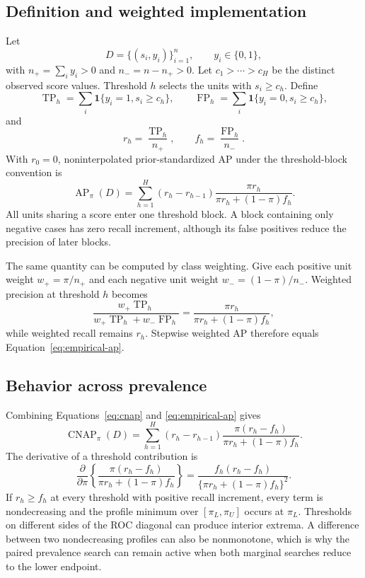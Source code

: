 \documentclass[11pt]{article}
\newcommand{\AP}{\operatorname{AP}}
\newcommand{\CNAP}{\operatorname{CNAP}}
\theoremstyle{remark}
\begin{document}
\subsection{Definition and weighted implementation}

Let
\[
D=\{(s_i,y_i)\}_{i=1}^{n},
\qquad
y_i\in\{0,1\},
\]
with $n_+=\sum_i y_i>0$ and $n_-=n-n_+>0$. Let $c_1>\cdots>c_H$ be the distinct observed score values. Threshold $h$ selects the units with $s_i\geq c_h$. Define
\[
\operatorname{TP}_h
=
\sum_i\mathbf 1\{y_i=1,s_i\geq c_h\},
\qquad
\operatorname{FP}_h
=
\sum_i\mathbf 1\{y_i=0,s_i\geq c_h\},
\]
and
\[
r_h=\frac{\operatorname{TP}_h}{n_+},
\qquad
f_h=\frac{\operatorname{FP}_h}{n_-}.
\]
With $r_0=0$, noninterpolated prior-standardized AP under the threshold-block convention is
\begin{equation}
\AP_\pi(D)
=
\sum_{h=1}^{H}
(r_h-r_{h-1})
\frac{\pi r_h}
{\pi r_h+(1-\pi)f_h}.
\label{eq:empirical-ap}
\end{equation}
All units sharing a score enter one threshold block. A block containing only negative cases has zero recall increment, although its false positives reduce the precision of later blocks.

The same quantity can be computed by class weighting. Give each positive unit weight $w_+=\pi/n_+$ and each negative unit weight $w_-=(1-\pi)/n_-$. Weighted precision at threshold $h$ becomes
\[
\frac{w_+\operatorname{TP}_h}
{w_+\operatorname{TP}_h+w_-\operatorname{FP}_h}
=
\frac{\pi r_h}
{\pi r_h+(1-\pi)f_h},
\]
while weighted recall remains $r_h$. Stepwise weighted AP therefore equals Equation~\eqref{eq:empirical-ap}.

\subsection{Behavior across prevalence}

Combining Equations~\eqref{eq:cnap} and \eqref{eq:empirical-ap} gives
\begin{equation}
\CNAP_\pi(D)
=
\sum_{h=1}^{H}
(r_h-r_{h-1})
\frac{\pi(r_h-f_h)}
{\pi r_h+(1-\pi)f_h}.
\label{eq:cnap-profile}
\end{equation}
The derivative of a threshold contribution is
\begin{equation}
\frac{\partial}{\partial\pi}
\left\{
\frac{\pi(r_h-f_h)}
{\pi r_h+(1-\pi)f_h}
\right\}
=
\frac{f_h(r_h-f_h)}
{\{\pi r_h+(1-\pi)f_h\}^2}.
\label{eq:cnap-derivative}
\end{equation}
If $r_h\geq f_h$ at every threshold with positive recall increment, every term is nondecreasing and the profile minimum over $[\pi_L,\pi_U]$ occurs at $\pi_L$. Thresholds on different sides of the ROC diagonal can produce interior extrema. A difference between two nondecreasing profiles can also be nonmonotone, which is why the paired prevalence search can remain active when both marginal searches reduce to the lower endpoint.
\end{document}
